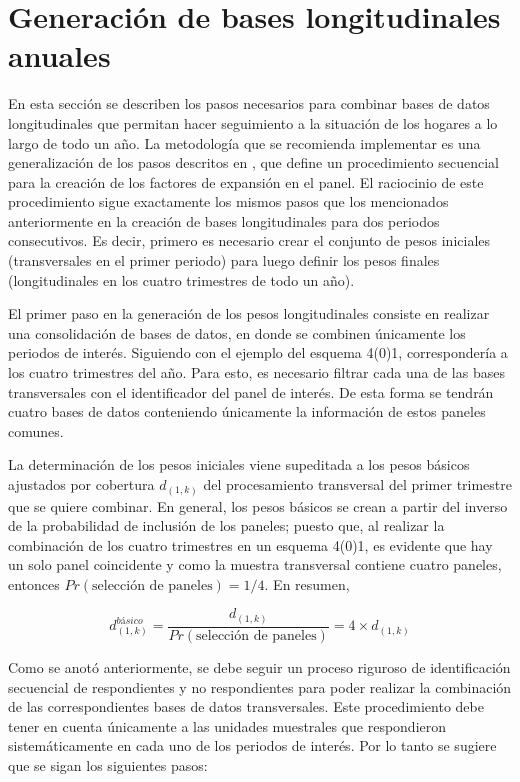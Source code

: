\documentclass[
  12pt,
  spanish,
]{book}
\begin{document}
\hypertarget{generaciuxf3n-de-bases-longitudinales-anuales}{%
\section{Generación de bases longitudinales anuales}\label{generaciuxf3n-de-bases-longitudinales-anuales}}

En esta sección se describen los pasos necesarios para combinar bases de datos longitudinales que permitan hacer seguimiento a la situación de los hogares a lo largo de todo un año. La metodología que se recomienda implementar es una generalización de los pasos descritos en \citet{Verma_Betti_Ghellini}, que define un procedimiento secuencial para la creación de los factores de expansión en el panel. El raciocinio de este procedimiento sigue exactamente los mismos pasos que los mencionados anteriormente en la creación de bases longitudinales para dos periodos consecutivos. Es decir, primero es necesario crear el conjunto de pesos iniciales (transversales en el primer periodo) para luego definir los pesos finales (longitudinales en los cuatro trimestres de todo un año).

El primer paso en la generación de los pesos longitudinales consiste en realizar una consolidación de bases de datos, en donde se combinen únicamente los periodos de interés. Siguiendo con el ejemplo del esquema 4(0)1, correspondería a los cuatro trimestres del año. Para esto, es necesario filtrar cada una de las bases transversales con el identificador del panel de interés. De esta forma se tendrán cuatro bases de datos conteniendo únicamente la información de estos paneles comunes.

La determinación de los pesos iniciales viene supeditada a los pesos básicos ajustados por cobertura \(d_{(1,k)}\) del procesamiento transversal del primer trimestre que se quiere combinar. En general, los pesos básicos se crean a partir del inverso de la probabilidad de inclusión de los paneles; puesto que, al realizar la combinación de los cuatro trimestres en un esquema 4(0)1, es evidente que hay un solo panel coincidente y como la muestra transversal contiene cuatro paneles, entonces \(Pr(\text{selección de paneles}) = 1/4\). En resumen,

\[
d_{(1,k)}^{básico}= \dfrac{d_{(1,k)}}{Pr(\text{selección de paneles})} = 4 \times d_{(1,k)} 
\]

Como se anotó anteriormente, se debe seguir un proceso riguroso de identificación secuencial de respondientes y no respondientes para poder realizar la combinación de las correspondientes bases de datos transversales. Este procedimiento debe tener en cuenta únicamente a las unidades muestrales que respondieron sistemáticamente en cada uno de los periodos de interés. Por lo tanto se sugiere que se sigan los siguientes pasos:
\end{document}
